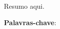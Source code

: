 \clearpage\mbox{}\clearpage

\begin{resumo}
    Resumo aqui.
    
    \vspace{\onelineskip}
    \noindent    
    \textbf{Palavras-chave}: \palavraschave
\end{resumo}

        


